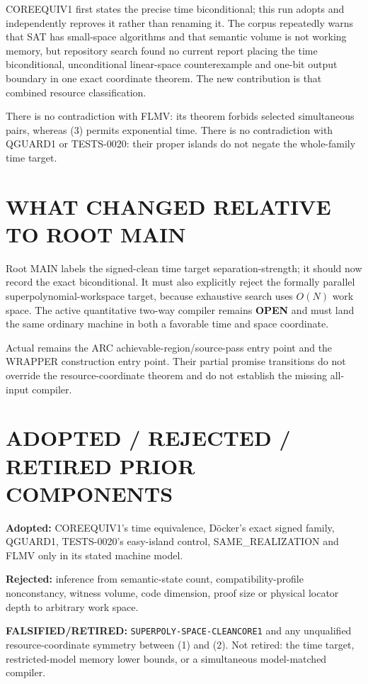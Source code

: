 \documentclass[11pt]{article}
\newcommand{\OPEN}{\textbf{OPEN}}
\begin{document}
COREEQUIV1 first states the precise time biconditional; this run adopts and
independently reproves it rather than renaming it.  The corpus repeatedly
warns that SAT has small-space algorithms and that semantic volume is not
working memory, but repository search found no current report placing the
time biconditional, unconditional linear-space counterexample and one-bit
output boundary in one exact coordinate theorem.  The new contribution is
that combined resource classification.

There is no contradiction with FLMV: its theorem forbids selected
simultaneous pairs, whereas (3) permits exponential time.  There is no
contradiction with QGUARD1 or TESTS-0020: their proper islands do not negate
the whole-family time target.

\section{WHAT CHANGED RELATIVE TO ROOT MAIN}

Root MAIN labels the signed-clean time target separation-strength; it should
now record the exact biconditional.  It must also explicitly reject the
formally parallel superpolynomial-workspace target, because exhaustive search
uses $O(N)$ work space.  The active quantitative two-way compiler remains
\OPEN{} and must land the same ordinary machine in both a favorable time and
space coordinate.

Actual  remains the ARC achievable-region/source-pass entry
point and  the WRAPPER construction entry point.  Their
partial promise transitions do not override the resource-coordinate theorem
and do not establish the missing all-input compiler.

\section{ADOPTED / REJECTED / RETIRED PRIOR COMPONENTS}

\textbf{Adopted:} COREEQUIV1's time equivalence, D\"ocker's exact signed
family, QGUARD1, TESTS-0020's easy-island control, SAME\_REALIZATION and FLMV
only in its stated machine model.

\textbf{Rejected:} inference from semantic-state count, compatibility-profile
nonconstancy, witness volume, code dimension, proof size or physical locator
depth to arbitrary work space.

\textbf{FALSIFIED/RETIRED:} \texttt{SUPERPOLY-SPACE-CLEANCORE1} and any
unqualified resource-coordinate symmetry between (1) and (2).  Not retired:
the time target, restricted-model memory lower bounds, or a simultaneous
model-matched compiler.
\end{document}
